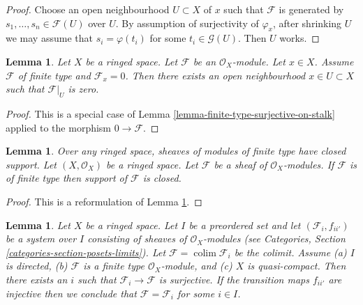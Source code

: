 \documentclass{stacks-project}
\newenvironment{slogan}{\comment}{\endcomment}
\theoremstyle{plain}
\newtheorem{lemma}[subsection]{Lemma}
\theoremstyle{definition}
\theoremstyle{remark}
\numberwithin{equation}{subsection}
\def\colim{\mathop{\mathrm{colim}}\nolimits}
\begin{document}
\begin{proof}
Choose an open neighbourhood $U \subset X$ of $x$ such that $\mathcal{F}$ is
generated by $s_1, \ldots, s_n \in \mathcal{F}(U)$ over $U$.
By assumption of surjectivity of $\varphi_x$,
after shrinking $U$ we may assume that $s_i = \varphi(t_i)$
for some $t_i \in \mathcal{G}(U)$.
Then $U$ works.
\end{proof}

\begin{lemma}
\label{lemma-finite-type-stalk-zero}
Let $X$ be a ringed space.
Let $\mathcal{F}$ be an $\mathcal{O}_X$-module.
Let $x \in X$.
Assume $\mathcal{F}$ of finite type and $\mathcal{F}_x = 0$.
Then there exists an open neighbourhood
$x \in U \subset X$ such that $\mathcal{F}|_U$ is zero.
\end{lemma}

\begin{proof}
This is a special case of
Lemma \ref{lemma-finite-type-surjective-on-stalk}
applied to the morphism $0 \to \mathcal{F}$.
\end{proof}

\begin{lemma}
\label{lemma-support-finite-type-closed}
\begin{slogan}
Over any ringed space, sheaves of modules of finite type have closed support.
\end{slogan}
Let $(X, \mathcal{O}_X)$ be a ringed space.
Let $\mathcal{F}$ be a sheaf of $\mathcal{O}_X$-modules.
If $\mathcal{F}$ is of finite type then support of $\mathcal{F}$ is closed.
\end{lemma}

\begin{proof}
This is a reformulation of Lemma \ref{lemma-finite-type-stalk-zero}.
\end{proof}

\begin{lemma}
\label{lemma-finite-type-quasi-compact-colimit}
Let $X$ be a ringed space. Let $I$ be a preordered set and
let $(\mathcal{F}_i, f_{ii'})$ be a system over $I$ consisting of sheaves
of $\mathcal{O}_X$-modules (see
Categories, Section \ref{categories-section-posets-limits}).
Let $\mathcal{F} = \colim \mathcal{F}_i$ be the colimit. Assume
(a) $I$ is directed,
(b) $\mathcal{F}$ is a finite type $\mathcal{O}_X$-module, and
(c) $X$ is quasi-compact. Then there exists an $i$ such that
$\mathcal{F}_i \to \mathcal{F}$ is surjective.
If the transition maps $f_{ii'}$ are injective
then we conclude that $\mathcal{F} = \mathcal{F}_i$ for some $i \in I$.
\end{lemma}
\end{document}

